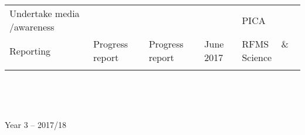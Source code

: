 \documentclass[version=last,
    paper=a4,                               %
    10pt,                                   %
    dvipsnames,
    oneside,                              %
    headings=openany,                       %
    open=any,
    BCOR=7mm,                               %
    DIV=15,     %
]{scrbook}
\begin{document}
\begin{longtable}[c]{@{}lllll@{}}
\begin{minipage}[t]{0.17\columnwidth}\raggedright
Undertake media /awareness
\end{minipage} & \begin{minipage}[t]{0.17\columnwidth}\raggedright
~
\end{minipage} & \begin{minipage}[t]{0.17\columnwidth}\raggedright
~
\end{minipage} & \begin{minipage}[t]{0.17\columnwidth}\raggedright
~
\end{minipage} & \begin{minipage}[t]{0.17\columnwidth}\raggedright
PICA~
\end{minipage}
\\\addlinespace
\begin{minipage}[t]{0.17\columnwidth}\raggedright
Reporting
\end{minipage} & \begin{minipage}[t]{0.17\columnwidth}\raggedright
Progress report
\end{minipage} & \begin{minipage}[t]{0.17\columnwidth}\raggedright
Progress report
\end{minipage} & \begin{minipage}[t]{0.17\columnwidth}\raggedright
June 2017
\end{minipage} & \begin{minipage}[t]{0.17\columnwidth}\raggedright
RFMS~~ \& Science
\end{minipage}
\\\addlinespace
\bottomrule
\end{longtable}

~

~

Year 3 -- 2017/18
\end{document}
